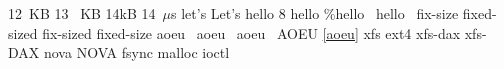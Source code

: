  12~KB
13 ~KB
14kB
14~$\mu$s
let's
Let's
hello\cite{aoeu}
8\x{}
hello \x{}
\%hello~\x{}
hello~\x{}
\x{}
\cite{}
 \cite{}
fix-size
fixed-sized
fix-sized
fixed-size
aoeu~
aoeu~
aoeu~
AOEU \ref{aoeu}
xfs
ext4
xfs-dax
xfs-DAX
nova
NOVA
fsync
malloc
ioctl
